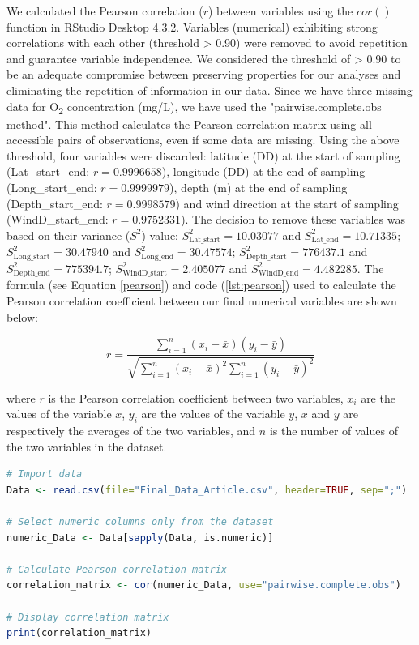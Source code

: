 We calculated the Pearson correlation ($r$) between variables using the $cor()$ function in RStudio Desktop 4.3.2. Variables (numerical) exhibiting strong correlations with each other (threshold > 0.90) were removed to avoid repetition and guarantee variable independence. We considered the threshold of > 0.90 to be an adequate compromise between preserving properties for our analyses and eliminating the repetition of information in our data. Since we have three missing data for O\textsubscript{2} concentration (mg/L), we have used the "pairwise.complete.obs method". This method calculates the Pearson correlation matrix using all accessible pairs of observations, even if some data are missing. Using the above threshold, four variables were discarded: latitude (DD) at the start of sampling (Lat_start_end: $r = 0.9996658$), longitude (DD) at the end of sampling (Long_start_end: $r = 0.9999979$), depth (m) at the end of sampling (Depth_start_end: $r = 0.9998579$) and wind direction at the start of sampling (WindD_start_end: $r = 0.9752331$). The decision to remove these variables was based on their variance ($S^2$) value: $S^2_\text{Lat\_start} = 10.03077$ and $S^2_\text{Lat\_end} = 10.71335$; $S^2_\text{Long\_start} = 30.47940$ and $S^2_\text{Long\_end} = 30.47574$; $S^2_\text{Depth\_start} = 776437.1$ and $S^2_\text{Depth\_end} = 775394.7$; $S^2_\text{WindD\_start} = 2.405077$ and $S^2_\text{WindD\_end} = 4.482285$. The formula (see Equation \ref{pearson}) and code (\autoref{lst:pearson}) used to calculate the Pearson correlation coefficient between our final numerical variables are shown below:

\begin{equation}\label{pearson}
    r = \frac{\sum_{i=1}^{n} (x_i - \bar{x})(y_i - \bar{y})}{\sqrt{\sum_{i=1}^{n} (x_i - \bar{x})^2 \sum_{i=1}^{n} (y_i - \bar{y})^2}}
\end{equation}

where $r$ is the Pearson correlation coefficient between two variables, $x_i$ are the values of the variable $x$, $y_i$ are the values of the variable $y$, $\bar{x}$ and $\bar{y}$ are respectively the averages of the two variables, and $n$ is the number of values of the two variables in the dataset.

\begin{lstlisting}[label=lst:pearson,language=R,caption=RStudio script to calculate the Pearson correlation coefficient between all the numerical variables in our final dataset.]
# Import data
Data <- read.csv(file="Final_Data_Article.csv", header=TRUE, sep=";")

# Select numeric columns only from the dataset
numeric_Data <- Data[sapply(Data, is.numeric)]

# Calculate Pearson correlation matrix
correlation_matrix <- cor(numeric_Data, use="pairwise.complete.obs")

# Display correlation matrix
print(correlation_matrix)
\end{lstlisting}

